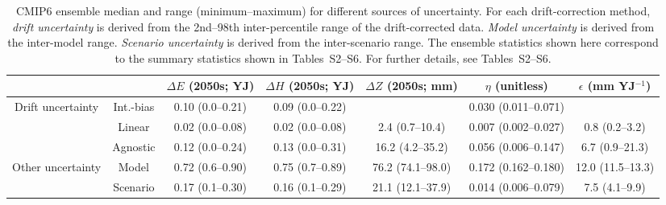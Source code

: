 \begin{table*}[t]
\centering
\caption{CMIP6 ensemble median and range (minimum–maximum) for different sources of uncertainty. For each drift-correction method, \emph{drift uncertainty} is derived from the 2nd--98th inter-percentile range of the drift-corrected data. \emph{Model uncertainty} is derived from the inter-model range. \emph{Scenario uncertainty} is derived from the inter-scenario range. The ensemble statistics shown here correspond to the summary statistics shown in Tables~S2--S6. For further details, see Tables~S2--S6.}
\begin{tabular}{cc|c|c|c|c|c}
\toprule
 &  & $\Delta E$ (2050s; YJ) & $\Delta H$ (2050s; YJ) & $\Delta Z$ (2050s; mm) & $\eta$ (unitless) & $\epsilon$ (mm YJ$^{-1}$) \\
\midrule
\multirow[c]{3}{*}{Drift uncertainty} & Int.-bias & 0.10 (0.0–0.21) & 0.09 (0.0–0.22) &  & 0.030 (0.011–0.071) &  \\
 & Linear & 0.02 (0.0–0.08) & 0.02 (0.0–0.08) & 2.4 (0.7–10.4) & 0.007 (0.002–0.027) & 0.8 (0.2–3.2) \\
 & Agnostic & 0.12 (0.0–0.24) & 0.13 (0.0–0.31) & 16.2 (4.2–35.2) & 0.056 (0.006–0.147) & 6.7 (0.9–21.3) \\
\midrule
\multirow[c]{2}{*}{Other uncertainty} & Model & 0.72 (0.6–0.90) & 0.75 (0.7–0.89) & 76.2 (74.1–98.0) & 0.172 (0.162–0.180) & 12.0 (11.5–13.3) \\
 & Scenario & 0.17 (0.1–0.30) & 0.16 (0.1–0.29) & 21.1 (12.1–37.9) & 0.014 (0.006–0.079) & 7.5 (4.1–9.9) \\
\bottomrule
\end{tabular}
\end{table*}
